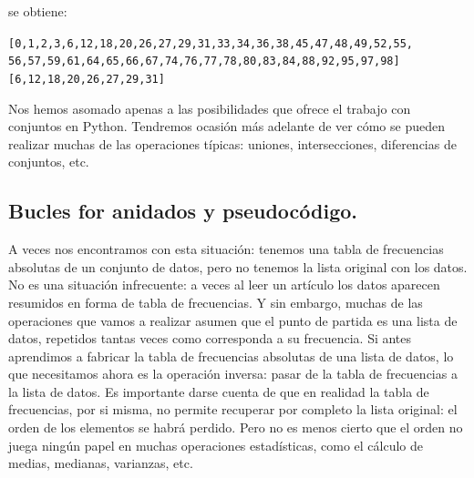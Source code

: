 \documentclass[10pt,a4paper]{article}\usepackage[]{graphicx}\usepackage[]{color}
\makeatletter
\newenvironment{kframe}{%
 \def\at@end@of@kframe{}%
 \ifinner\ifhmode%
  \def\at@end@of@kframe{\end{minipage}}%
  \begin{minipage}{\columnwidth}%
 \fi\fi%
 \def\FrameCommand##1{\hskip\@totalleftmargin \hskip-\fboxsep
 \colorbox{shadecolor}{##1}\hskip-\fboxsep
     \hskip-\linewidth \hskip-\@totalleftmargin \hskip\columnwidth}%
 \MakeFramed {\advance\hsize-\width
   \@totalleftmargin\z@ \linewidth\hsize
   \@setminipage}}%
 {\par\unskip\endMakeFramed%
 \at@end@of@kframe}
\newenvironment{knitrout}{}{} %
\newcounter {cont01}
\makeatother
\begin{document}
se obtiene:
\begin{knitrout}
\color{fgcolor}\begin{kframe}
\begin{alltt}
[0, 1, 2, 3, 6, 12, 18, 20, 26, 27, 29, 31, 33, 34, 36, 38, 45, 47, 48, 49, 52, 55,
 56, 57, 59, 61, 64, 65, 66, 67, 74, 76, 77, 78, 80, 83, 84, 88, 92, 95, 97, 98]
[6, 12, 18, 20, 26, 27, 29, 31]
\end{alltt}
\end{kframe}
\end{knitrout}
Nos hemos asomado apenas a las posibilidades que ofrece el trabajo con conjuntos en Python. Tendremos ocasión más adelante de ver cómo se pueden realizar muchas de las operaciones típicas: uniones, intersecciones, diferencias de conjuntos, etc.

\subsection{Bucles for anidados y pseudocódigo.}
\label{tut02:subsec:buclesForAnidados}

A veces nos encontramos con esta situación: tenemos una tabla de frecuencias absolutas de un conjunto de datos, pero no tenemos la lista original con los datos. No es una situación infrecuente: a veces al leer un artículo los datos aparecen resumidos en forma de tabla de frecuencias. Y sin embargo, muchas de las operaciones que vamos a realizar asumen que el punto de partida es una lista de datos, repetidos tantas veces como corresponda a su frecuencia. Si antes aprendimos a fabricar la tabla de frecuencias absolutas de una lista de datos, lo que necesitamos ahora es la operación inversa: pasar de la tabla de frecuencias a la lista de datos. Es importante darse cuenta de que en realidad la tabla de frecuencias, por si misma, no permite recuperar por completo la lista original: el orden de los elementos se habrá perdido. Pero no es menos cierto que el orden no juega ningún papel en muchas operaciones estadísticas, como el cálculo de medias, medianas, varianzas, etc.
\end{document}

